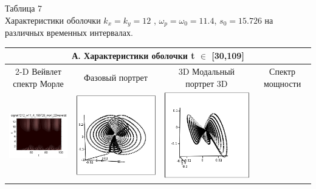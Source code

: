 \documentclass[12pt,letterpaper]{extreport}
\begin{document}
\begin{table}[H]

{\setlength{\arrayrulewidth}{1.25pt}
\begin{flushright}
Таблица 7\\
Характеристики оболочки $k_x=k_y=12$ , $\omega_p= 
\omega_0 =11.4$, $s_0=15.726$
на различных временных интервалах.

\end{flushright}
\begin{tabular}{|c|c|c|c|}

\hline
\multicolumn{4}{|c|}{А. Характеристики оболочки t $
\in$ [30,109]}

\\
\hline
\footnotesize 2-D Вейвлет спектр Морле&
\footnotesize Фазовый 
портрет&\footnotesize 3D
Модальный
портрет 3D&\footnotesize Спектр мощности\\
\hline
	\includegraphics[scale=1]{a1} 	
	&	
	\includegraphics[scale=1]{a2} 	
	&	
	\includegraphics[scale=1]{a3} 

\end{tabular}}
\end{table}
\end{document}
